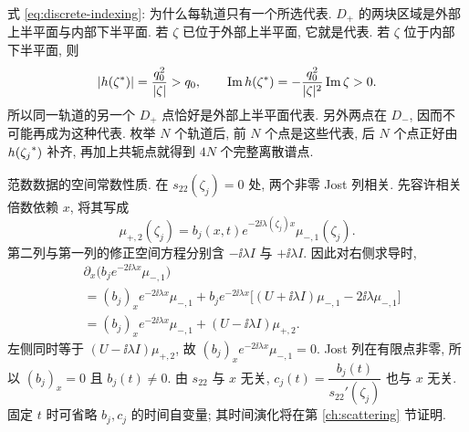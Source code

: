 \par\smallskip\noindent 式 \eqref{eq:discrete-indexing}: 为什么每轨道只有一个所选代表.\quad
$D_+$ 的两块区域是外部上半平面与内部下半平面.
若 $\zeta$ 已位于外部上半平面, 它就是代表.
若 $\zeta$ 位于内部下半平面, 则
\begin{equation*}
|h({\zeta}^{*})|=\dfrac{q_0^2}{|\zeta|}>q_0,
\qquad
\operatorname{Im}h({\zeta}^{*})
=-\dfrac{q_0^2}{|\zeta|^2}\operatorname{Im}\zeta>0.
\end{equation*}
所以同一轨道的另一个 $D_+$ 点恰好是外部上半平面代表.
另外两点在 $D_-$, 因而不可能再成为这种代表.
枚举 $N$ 个轨道后, 前 $N$ 个点是这些代表,
后 $N$ 个点正好由 $h({\zeta_j}^{*})$ 补齐,
再加上共轭点就得到 $4N$ 个完整离散谱点.

\par\smallskip\noindent 范数数据的空间常数性质.\quad
在 $s_{22}(\zeta_j)=0$ 处, 两个非零 Jost 列相关.
先容许相关倍数依赖 $x$, 将其写成
\begin{equation*}
\mu_{+,2}(\zeta_j)
=b_j(x,t)e^{-2\ii\lambda(\zeta_j)x}\mu_{-,1}(\zeta_j).
\end{equation*}
第二列与第一列的修正空间方程分别含 $-\ii\lambda I$ 与 $+\ii\lambda I$.
因此对右侧求导时,
\begin{align*}
&\partial_x\bigl(b_je^{-2\ii\lambda x}\mu_{-,1}\bigr)\\
&=(b_j)_xe^{-2\ii\lambda x}\mu_{-,1}
+b_je^{-2\ii\lambda x}
\bigl[(U+\ii\lambda I)\mu_{-,1}-2\ii\lambda\mu_{-,1}\bigr]\\
&=(b_j)_xe^{-2\ii\lambda x}\mu_{-,1}
+(U-\ii\lambda I)\mu_{+,2}.
\end{align*}
左侧同时等于 $(U-\ii\lambda I)\mu_{+,2}$,
故 $(b_j)_xe^{-2\ii\lambda x}\mu_{-,1}=0$.
Jost 列在有限点非零, 所以 $(b_j)_x=0$ 且 $b_j(t)\ne0$.
由 $s_{22}$ 与 $x$ 无关, $c_j(t)=\dfrac{b_j(t)}{s_{22}'(\zeta_j)}$ 也与 $x$ 无关.
固定 $t$ 时可省略 $b_j,c_j$ 的时间自变量;
其时间演化将在第 \ref{ch:scattering} 节证明.

